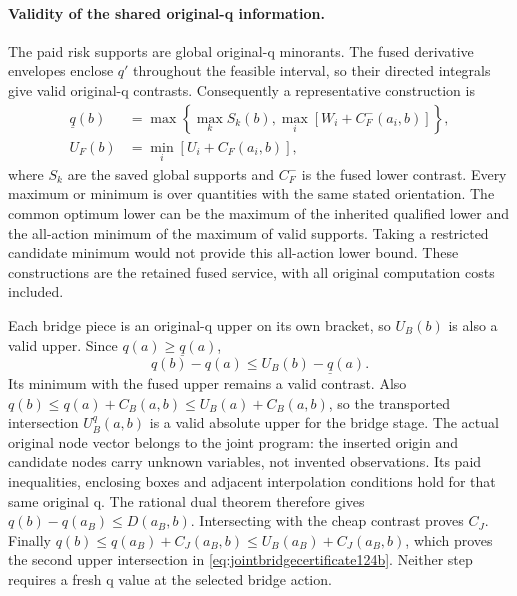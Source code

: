 \paragraph{Validity of the shared original-q information.}
The paid risk supports are global original-q minorants.
The fused derivative envelopes enclose $q'$ throughout the
feasible interval, so their directed integrals give valid
original-q contrasts. Consequently a representative construction is
\begin{align*}
 \underline q(b)&=\max\left\{\max_k S_k(b),
             \max_i[W_i+C_F^-(a_i,b)]\right\},\\
 U_F(b)&=\min_i[U_i+C_F(a_i,b)],
\end{align*}
where $S_k$ are the saved global supports and $C_F^-$ is
the fused lower contrast. Every maximum or minimum is over
quantities with the same stated orientation. The common optimum
lower can be the maximum of the inherited qualified lower
and the all-action minimum of the maximum of valid supports.
Taking a restricted candidate minimum would not provide this
all-action lower bound. These constructions are the retained
fused service, with all original computation costs included.

Each bridge piece is an original-q upper on its own bracket,
so $U_B(b)$ is also a valid upper. Since
$q(a)\ge\underline q(a)$,
\[
 q(b)-q(a)\le U_B(b)-\underline q(a).
\]
Its minimum with the fused upper remains a valid contrast.
Also $q(b)\le q(a)+C_B(a,b)\le U_B(a)+C_B(a,b)$,
so the transported intersection $U_B^q(a,b)$ is a valid
absolute upper for the bridge stage.
The actual original node vector belongs to the joint program:
the inserted origin and candidate nodes carry unknown variables,
not invented observations. Its paid inequalities, enclosing
boxes and adjacent interpolation conditions hold for that
same original q. The rational dual theorem therefore gives
$q(b)-q(a_B)\le D(a_B,b)$. Intersecting with the cheap
contrast proves $C_J$. Finally
$q(b)\le q(a_B)+C_J(a_B,b)\le U_B(a_B)+C_J(a_B,b)$,
which proves the second upper intersection in
\eqref{eq:jointbridgecertificate124b}. Neither step requires
a fresh q value at the selected bridge action.

